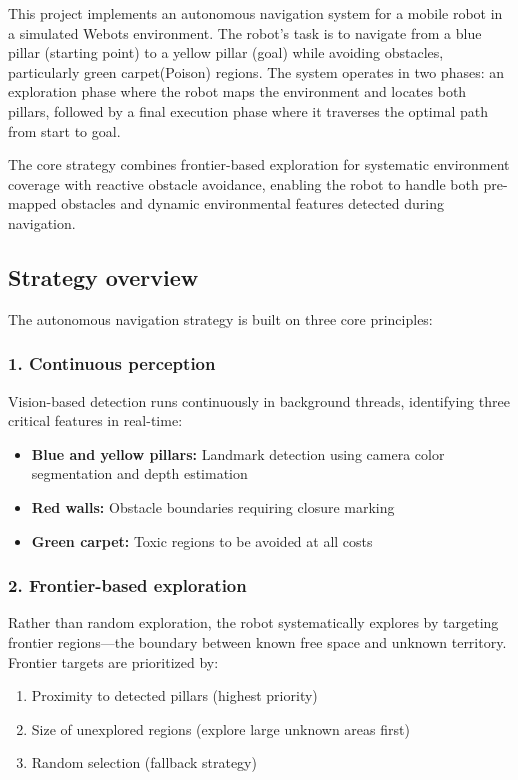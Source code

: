 \documentclass{article}
\begin{document}
This project implements an autonomous navigation system for a mobile robot in a simulated Webots environment. The robot's task is to navigate from a blue pillar (starting point) to a yellow pillar (goal) while avoiding obstacles, particularly green carpet(Poison) regions. The system operates in two phases: an exploration phase where the robot maps the environment and locates both pillars, followed by a final execution phase where it traverses the optimal path from start to goal.

The core strategy combines frontier-based exploration for systematic environment coverage with reactive obstacle avoidance, enabling the robot to handle both pre-mapped obstacles and dynamic environmental features detected during navigation.

\subsection{Strategy overview}

The autonomous navigation strategy is built on three core principles:

\subsubsection*{1. Continuous perception}
Vision-based detection runs continuously in background threads, identifying three critical features in real-time:
\begin{itemize}
    \item \textbf{Blue and yellow pillars:} Landmark detection using camera color segmentation and depth estimation
    \item \textbf{Red walls:} Obstacle boundaries requiring closure marking
    \item \textbf{Green carpet:} Toxic regions to be avoided at all costs
\end{itemize}

\subsubsection*{2. Frontier-based exploration}
Rather than random exploration, the robot systematically explores by targeting frontier regions—the boundary between known free space and unknown territory. Frontier targets are prioritized by:
\begin{enumerate}
    \item Proximity to detected pillars (highest priority)
    \item Size of unexplored regions (explore large unknown areas first)
    \item Random selection (fallback strategy)
\end{enumerate}
\end{document}

